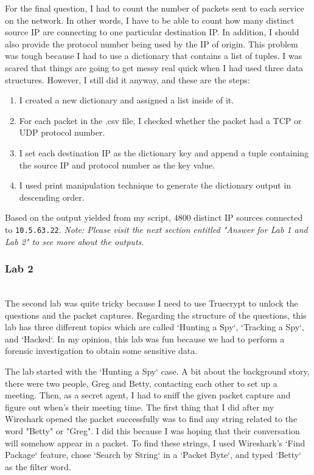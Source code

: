 \documentclass[letterpaper,10pt,titlepage,draftclsnofoot,onecolumn]{IEEEtran}
\begin{document}
For the final question, I had to count the number of packets sent to each service on the network. 
In other words, I have to be able to count how many distinct source IP are connecting to one particular destination IP. 
In addition, I should also provide the protocol number being used by the IP of origin.
This problem was tough because I had to use a dictionary that contains a list of tuples.
I was scared that things are going to get messy real quick when I had used three data structures.
However, I still did it anyway, and these are the steps: 
\begin{enumerate}
\item I created a new dictionary and assigned a list inside of it.
\item For each packet in the .csv file, I checked whether the packet had a TCP or UDP protocol number.
\item I set each destination IP as the dictionary key and append a tuple containing the source IP and protocol number as the key value.
\item I used print manipulation technique to generate the dictionary output in descending order.
\end{enumerate}
Based on the output yielded from my script, 4800 distinct IP sources connected to \verb|10.5.63.22|. 
\textit{Note: Please visit the next section entitled "Answer for Lab 1 and Lab 2" to see more about the outputs.}
\hfill\\
\subsubsection{Lab 2}
\hfill\\
The second lab was quite tricky because I need to use Truecrypt to unlock the questions and the packet captures.
Regarding the structure of the questions, this lab has three different topics which are called `Hunting a Spy`, `Tracking a Spy`, and `Hacked`.
In my opinion, this lab was fun because we had to perform a forensic investigation to obtain some sensitive data. 

The lab started with the `Hunting a Spy` case. 
A bit about the background story, there were two people, Greg and Betty, contacting each other to set up a meeting.
Then, as a secret agent, I had to sniff the given packet capture and figure out when's their meeting time.
The first thing that I did after my Wireshark opened the packet successfully was to find any string related to the word "Betty" or "Greg". 
I did this because I was hoping that their conversation will somehow appear in a packet.
To find these strings, I used Wireshark's `Find Package` feature, chose `Search by String` in a `Packet Byte`, and typed `Betty` as the filter word.
\end{document}
